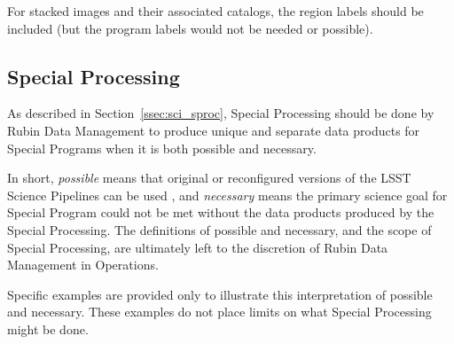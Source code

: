 For stacked images and their associated catalogs, the region labels should be
included (but the program labels would not be needed or possible).


\subsection{Special Processing}\label{ssec:proc_special}

As described in Section~\ref{ssec:sci_sproc}, 
Special Processing should be done by Rubin Data Management to 
produce unique and separate data products
for Special Programs when it is both possible and necessary.

In short, \emph{possible} means that original or reconfigured versions of the LSST
Science Pipelines can be used , and \emph{necessary} means the primary science goal for Special Program
could not be met without the data products produced by the Special Processing.
The definitions of possible and necessary, and the scope of Special Processing,
are ultimately left to the discretion of Rubin Data Management in Operations.

Specific examples are provided only to illustrate this interpretation of possible and necessary.
These examples do not place limits on what Special Processing might be done.

